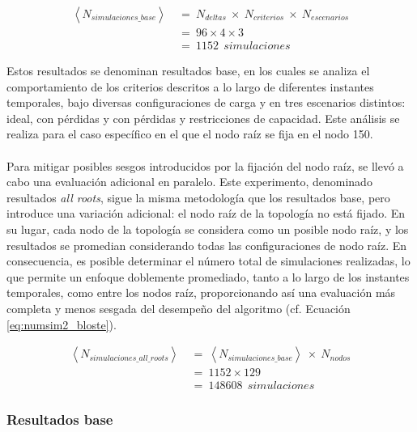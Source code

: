 \begin{equation}\label{eq:numsim_bloste}
\begin{aligned}
    \left \langle N_{simulaciones\_base} \right \rangle  \: & = \: N_{deltas} \: \times \: N_{criterios} \: \times \:  N_{escenarios} \\ 
    \: & = \: 96 \times 4 \times 3 \\
    \: & = \: 1152 \: \: simulaciones
\end{aligned}    
\end{equation}
\vspace{0.2cm}

Estos resultados se denominan resultados base, en los cuales se analiza el comportamiento de los criterios descritos a lo largo de diferentes instantes temporales, bajo diversas configuraciones de carga y en tres escenarios distintos: ideal, con pérdidas y con pérdidas y restricciones de capacidad. Este análisis se realiza para el caso específico en el que el nodo raíz se fija en el nodo 150. \\
\\
Para mitigar posibles sesgos introducidos por la fijación del nodo raíz, se llevó a cabo una evaluación adicional en paralelo. Este experimento, denominado resultados \textit{all roots}, sigue la misma metodología que los resultados base, pero introduce una variación adicional: el nodo raíz de la topología no está fijado. En su lugar, cada nodo de la topología se considera como un posible nodo raíz, y los resultados se promedian considerando todas las configuraciones de nodo raíz. En consecuencia, es posible determinar el número total de simulaciones realizadas, lo que permite un enfoque doblemente promediado, tanto a lo largo de los instantes temporales, como entre los nodos raíz, proporcionando así una evaluación más completa y menos sesgada del desempeño del algoritmo (cf. Ecuación \ref{eq:numsim2_bloste}).

\begin{equation}\label{eq:numsim2_bloste}
\begin{aligned}
    \left \langle N_{simulaciones\_all\_roots} \right \rangle  \: & = \: \left \langle N_{simulaciones\_base} \right \rangle \: \times \: N_{nodos}\\ 
    \: & = \: 1152 \times 129 \\
    \: & = \: 148608 \: \: simulaciones
\end{aligned}    
\end{equation}

\subsubsection{Resultados base}

